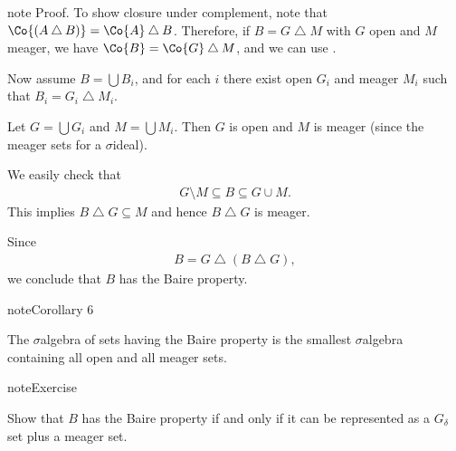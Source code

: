 \documentclass[letterpaper,10pt,english]{jupyterBook}
\begin{document}
\begin{sphinxadmonition}{note}
\sphinxAtStartPar
Proof. To show closure under complement, note that \(\Co{(A \bigtriangleup B)} = \Co{A} \bigtriangleup B\). Therefore,
if \(B = G \bigtriangleup M\) with \(G\) open and \(M\) meager, we have \(\Co{B} = \Co{G} \bigtriangleup M\), and we can use {\hyperref[\detokenize{measure:lem-BP-closed}]{}}.

\sphinxAtStartPar
Now assume \(B = \bigcup B_i\), and for each \(i\) there exist open \(G_i\) and meager \(M_i\) such that \(B_i = G_i \bigtriangleup M_i\).

\sphinxAtStartPar
Let \(G = \bigcup G_i\) and \(M = \bigcup M_i\). Then \(G\) is open and \(M\) is meager (since the meager sets for a \(\sigma\)\sphinxhyphen{}ideal).

\sphinxAtStartPar
We easily check that
\begin{equation*}
\begin{split}
G \setminus M  \subseteq B \subseteq G \cup M.
\end{split}
\end{equation*}
\sphinxAtStartPar
This implies \(B \bigtriangleup G \subseteq M\) and hence \(B \bigtriangleup G\) is meager.

\sphinxAtStartPar
Since
\begin{equation*}
\begin{split}
B = G \bigtriangleup (B \bigtriangleup G),
\end{split}
\end{equation*}
\sphinxAtStartPar
we conclude that \(B\) has the Baire property.
\end{sphinxadmonition}
\label{measure:cor-BP-algebra-small}
\begin{sphinxadmonition}{note}{Corollary 6}



\sphinxAtStartPar
The \(\sigma\)\sphinxhyphen{}algebra of sets having the Baire property is the smallest \(\sigma\)\sphinxhyphen{}algebra containing all open and all meager sets.
\end{sphinxadmonition}
\label{\detokenize{measure:exercise-bp-gdelta-plus}}
\begin{sphinxadmonition}{note}{Exercise}

\sphinxAtStartPar
Show that \(B\) has the Baire property if and only if it can be represented as a \(G_\delta\) set plus a meager set.
\end{sphinxadmonition}
\end{document}
